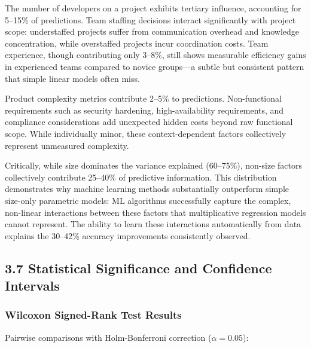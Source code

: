 \documentclass[11pt,a4paper]{article}
\begin{document}
The number of developers on a project exhibits tertiary influence, accounting for 5--15\% of predictions. Team staffing decisions interact significantly with project scope: understaffed projects suffer from communication overhead and knowledge concentration, while overstaffed projects incur coordination costs. Team experience, though contributing only 3--8\%, still shows measurable efficiency gains in experienced teams compared to novice groups---a subtle but consistent pattern that simple linear models often miss.

Product complexity metrics contribute 2--5\% to predictions. Non-functional requirements such as security hardening, high-availability requirements, and compliance considerations add unexpected hidden costs beyond raw functional scope. While individually minor, these context-dependent factors collectively represent unmeasured complexity.

Critically, while size dominates the variance explained (60--75\%), non-size factors collectively contribute 25--40\% of predictive information. This distribution demonstrates why machine learning methods substantially outperform simple size-only parametric models: ML algorithms successfully capture the complex, non-linear interactions between these factors that multiplicative regression models cannot represent. The ability to learn these interactions automatically from data explains the 30--42\% accuracy improvements consistently observed.

\subsection{3.7 Statistical Significance and Confidence Intervals}

\subsubsection{Wilcoxon Signed-Rank Test Results}

Pairwise comparisons with Holm-Bonferroni correction ($\alpha = 0.05$):
\end{document}
